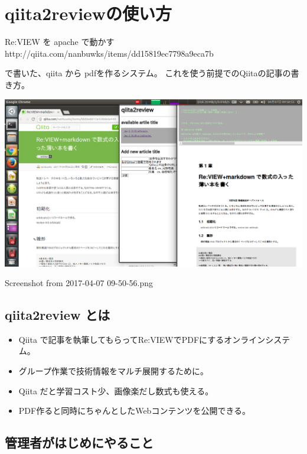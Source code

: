 \chapter{qiita2reviewの使い方}
\label{chap:howtoQiita2Review}

Re:VIEW を apache で動かす
http://qiita.com/nanbuwks/items/dd15819ec7798a9eca7b

で書いた、qiita から pdfを作るシステム。
これを使う前提でのQiitaの記事の書き方。

\begin{reviewimage}
\includegraphics[width=\maxwidth]{./images/80cbc196-d4ef-b880-733c-54d0a8aa45bb.png}
\caption{Screenshot from 2017{-}04{-}07 09{-}50{-}56.png}
\label{image:howtoQiita2Review:80cbc196-d4ef-b880-733c-54d0a8aa45bb}
\end{reviewimage}

\section{qiita2review とは}
\label{sec:1-1}

\begin{itemize}
\item Qiita で記事を執筆してもらってRe:VIEWでPDFにするオンラインシステム。
\item グループ作業で技術情報をマルチ展開するために。
\item Qiita だと学習コスト少、画像楽だし数式も使える。
\item PDF作ると同時にちゃんとしたWebコンテンツを公開できる。
\end{itemize}

\section{管理者がはじめにやること}
\label{sec:1-2}


